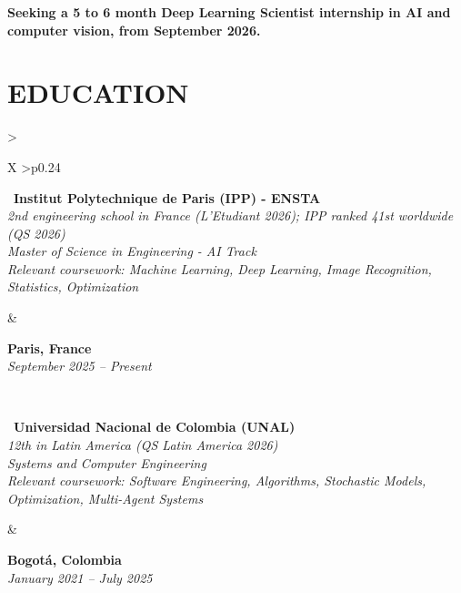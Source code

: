\documentclass[letterpaper,10pt]{article}
\begin{document}
\textbf{Seeking a 5 to 6 month Deep Learning Scientist internship in AI and computer vision, from September 2026.}

\vspace{-0.05cm}

\section{\textcolor{mydarkgreen}{\textbf{EDUCATION}}}

\begin{tabularx}{\textwidth}{>{\raggedright\arraybackslash}X >{\raggedleft\arraybackslash}p{0.24\textwidth}}
  \begin{minipage}[t]{\linewidth}\raggedright
  \textbullet\ \textbf{Institut Polytechnique de Paris (IPP) - ENSTA}\\
  \textit{\footnotesize 2nd engineering school in France (L'Etudiant 2026); IPP ranked 41st worldwide (QS 2026)}\\
  \textit{\footnotesize Master of Science in Engineering - AI Track}\\
  \textit{\footnotesize Relevant coursework: Machine Learning, Deep Learning, Image Recognition, Statistics, Optimization}
  \end{minipage}
  &
  \begin{minipage}[t]{\linewidth}\raggedleft
  \textbf{Paris, France}\\
  {\footnotesize\textit{September 2025 -- Present}}
  \end{minipage}
  \\
  \begin{minipage}[t]{\linewidth}
  \textbullet\ \textbf{Universidad Nacional de Colombia (UNAL)}\\
  \textit{\footnotesize 12th in Latin America (QS Latin America 2026)}\\
  \textit{\footnotesize Systems and Computer Engineering}\\
  \textit{\footnotesize Relevant coursework: Software Engineering, Algorithms, Stochastic Models, Optimization, Multi-Agent Systems}
  \end{minipage}
  &
  \begin{minipage}[t]{\linewidth}\raggedleft
  \textbf{Bogotá, Colombia}\\
  {\footnotesize\textit{January 2021 -- July 2025}}
  \end{minipage}

\end{tabularx}
\end{document}
